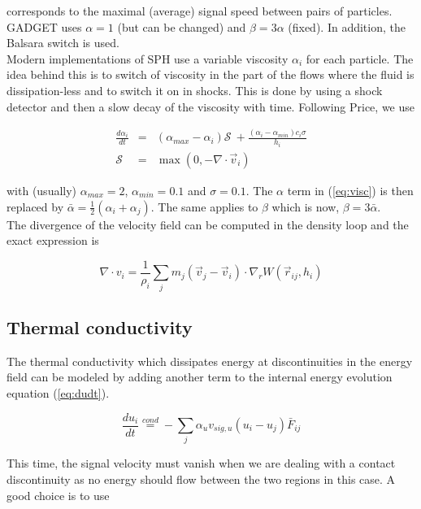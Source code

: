 \documentclass[a4paper,10pt]{report}
\begin{document}
corresponds to the maximal (average) signal speed between pairs of particles.
GADGET uses $\alpha=1$ (but can be changed) and $\beta=3\alpha$ (fixed). In addition, the Balsara switch is used. \\

Modern implementations of SPH use a variable viscosity $\alpha_i$ for each particle. The idea behind this is to switch
of viscosity in the part of the flows where the fluid is dissipation-less and to switch it on in shocks. This is done by
using a shock detector and then a slow decay of the viscosity with time. Following Price, we use

\begin{eqnarray}
 \frac{d\alpha_i}{dt} &=& \left(\alpha_{max}-\alpha_i\right)\mathcal{S}~+\frac{(\alpha_i-\alpha_{min})c_i\sigma}{h_i}\\
 \mathcal{S} &=& \max\left(0, -\nabla\cdot \vec{v}_i \right)
\end{eqnarray}

with (usually) $\alpha_{max} = 2$, $\alpha_{min} = 0.1$ and $\sigma=0.1$. The $\alpha$ term in (\ref{eq:visc}) is then
replaced by $\bar\alpha = \frac{1}{2}(\alpha_i + \alpha_j)$. The same applies to $\beta$ which is now, $\beta =
3\bar\alpha$.\\
The divergence of the velocity field can be computed in the density loop and the exact expression is

\begin{equation}
 \label{eq:div_v}
 \nabla\cdot v_i = \frac{1}{\rho_i}\sum_j m_j \left(\vec{v}_j - \vec{v}_i\right)\cdot \nabla_r W(\vec{r}_{ij},h_i) 
\end{equation}

\subsection{Thermal conductivity}

The thermal conductivity  which dissipates energy at discontinuities in the energy field can be modeled by adding
another term to the internal energy evolution equation (\ref{eq:dudt}). 

\begin{equation}
 \frac{du_i}{dt} \stackrel{cond}{=} - \sum_j \alpha_u v_{sig,u}\left(u_i - u_j\right)\bar{F}_{ij}
\end{equation}

This time, the signal velocity must vanish when we are dealing with a contact discontinuity as no energy should flow
between the two regions in this case. A good choice is to use
\end{document}
